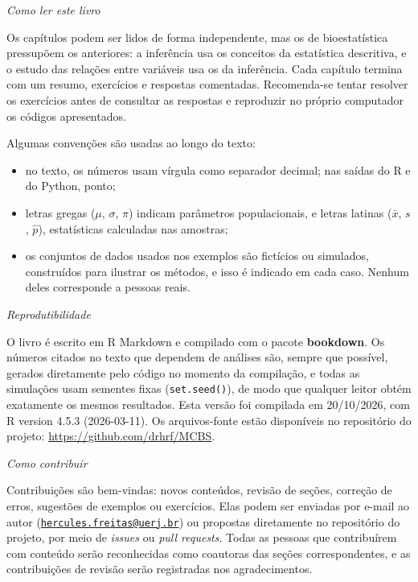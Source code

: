 \documentclass[
]{book}
\providecommand{\tightlist}{%
  \setlength{\itemsep}{0pt}\setlength{\parskip}{0pt}}
\begin{document}
\emph{Como ler este livro}

Os capítulos podem ser lidos de forma independente, mas os de bioestatística pressupõem os anteriores: a inferência usa os conceitos da estatística descritiva, e o estudo das relações entre variáveis usa os da inferência. Cada capítulo termina com um resumo, exercícios e respostas comentadas. Recomenda-se tentar resolver os exercícios antes de consultar as respostas e reproduzir no próprio computador os códigos apresentados.

Algumas convenções são usadas ao longo do texto:

\begin{itemize}
\tightlist
\item
  no texto, os números usam vírgula como separador decimal; nas saídas do R e do Python, ponto;
\item
  letras gregas (\(\mu\), \(\sigma\), \(\pi\)) indicam parâmetros populacionais, e letras latinas (\(\bar{x}\), \(s\), \(\hat{p}\)), estatísticas calculadas nas amostras;
\item
  os conjuntos de dados usados nos exemplos são fictícios ou simulados, construídos para ilustrar os métodos, e isso é indicado em cada caso. Nenhum deles corresponde a pessoas reais.
\end{itemize}

\emph{Reprodutibilidade}

O livro é escrito em R Markdown e compilado com o pacote \textbf{bookdown}. Os números citados no texto que dependem de análises são, sempre que possível, gerados diretamente pelo código no momento da compilação, e todas as simulações usam sementes fixas (\texttt{set.seed()}), de modo que qualquer leitor obtém exatamente os mesmos resultados. Esta versão foi compilada em 20/10/2026, com R version 4.5.3 (2026-03-11). Os arquivos-fonte estão disponíveis no repositório do projeto: \url{https://github.com/drhrf/MCBS}.

\emph{Como contribuir}

Contribuições são bem-vindas: novos conteúdos, revisão de seções, correção de erros, sugestões de exemplos ou exercícios. Elas podem ser enviadas por e-mail ao autor (\href{mailto:hercules.freitas@uerj.br}{\nolinkurl{hercules.freitas@uerj.br}}) ou propostas diretamente no repositório do projeto, por meio de \emph{issues} ou \emph{pull requests}. Todas as pessoas que contribuírem com conteúdo serão reconhecidas como coautoras das seções correspondentes, e as contribuições de revisão serão registradas nos agradecimentos.
\end{document}
